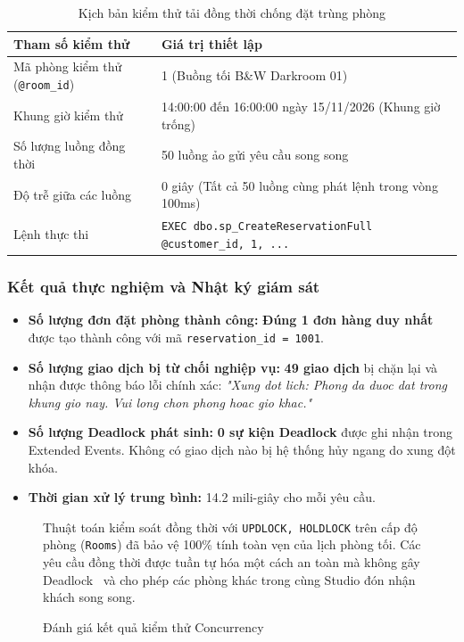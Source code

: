 \begin{table}[H]
\centering
\caption{Kịch bản kiểm thử tải đồng thời chống đặt trùng phòng}
\label{tab:tc_concurrency}
\begin{tabularx}{\textwidth}{l X}
\toprule
\textbf{Tham số kiểm thử} & \textbf{Giá trị thiết lập} \\
\midrule
Mã phòng kiểm thử (\texttt{@room\_id}) & 1 (Buồng tối B\&W Darkroom 01) \\
Khung giờ kiểm thử & 14:00:00 đến 16:00:00 ngày 15/11/2026 (Khung giờ trống) \\
Số lượng luồng đồng thời & 50 luồng ảo gửi yêu cầu song song \\
Độ trễ giữa các luồng & 0 giây (Tất cả 50 luồng cùng phát lệnh trong vòng 100ms) \\
Lệnh thực thi & \texttt{EXEC dbo.sp\_CreateReservationFull @customer\_id, 1, ...} \\
\bottomrule
\end{tabularx}
\end{table}

\subsubsection{Kết quả thực nghiệm và Nhật ký giám sát}
\begin{itemize}[leftmargin=2em]
    \item \textbf{Số lượng đơn đặt phòng thành công:} \textbf{Đúng 1 đơn hàng duy nhất} được tạo thành công với mã \texttt{reservation\_id = 1001}.
    \item \textbf{Số lượng giao dịch bị từ chối nghiệp vụ:} \textbf{49 giao dịch} bị chặn lại và nhận được thông báo lỗi chính xác: \textit{"Xung dot lich: Phong da duoc dat trong khung gio nay. Vui long chon phong hoac gio khac."}
    \item \textbf{Số lượng Deadlock phát sinh:} \textbf{0 sự kiện Deadlock} được ghi nhận trong Extended Events. Không có giao dịch nào bị hệ thống hủy ngang do xung đột khóa.
    \item \textbf{Thời gian xử lý trung bình:} 14.2 mili-giây cho mỗi yêu cầu.
\end{itemize}

\begin{figure}[H]
\centering
\begin{tcolorbox}[colback=green!5!white,colframe=green!60!black,title=\textbf{KẾT LUẬN KIỂM THỬ XỬ LÝ ĐỒNG THỜI}]
Thuật toán kiểm soát đồng thời với \texttt{UPDLOCK, HOLDLOCK} trên cấp độ phòng (\texttt{Rooms}) đã bảo vệ 100\% tính toàn vẹn của lịch phòng tối. Các yêu cầu đồng thời được tuần tự hóa một cách an toàn mà không gây Deadlock~\cite{habibi2024towards, zhang2023adaptive} và cho phép các phòng khác trong cùng Studio đón nhận khách song song.
\end{tcolorbox}
\caption{Đánh giá kết quả kiểm thử Concurrency}
\end{figure}

